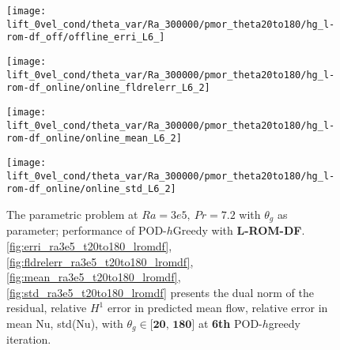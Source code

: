 \begin{figure}[h!]
    \begin{minipage}[b]{.25\linewidth}
        \centering \texttt{[image: lift\_0vel\_cond/theta\_var/Ra\_300000/pmor\_theta20to180/hg\_l-rom-df\_off/offline\_erri\_L6\_]}
        \label{fig:erri_ra3e5_t20to180_lromdf}
    \end{minipage}%
    \begin{minipage}[b]{.25\linewidth}
        \centering \texttt{[image: lift\_0vel\_cond/theta\_var/Ra\_300000/pmor\_theta20to180/hg\_l-rom-df\_online/online\_fldrelerr\_L6\_2]}
        \label{fig:fldrelerr_ra3e5_t20to180_lromdf}
    \end{minipage}
    \begin{minipage}[b]{.25\linewidth}
        \centering \texttt{[image: lift\_0vel\_cond/theta\_var/Ra\_300000/pmor\_theta20to180/hg\_l-rom-df\_online/online\_mean\_L6\_2]}
        \label{fig:mean_ra3e5_t20to180_lromdf}
    \end{minipage}%
    \begin{minipage}[b]{.25\linewidth}
        \centering \texttt{[image: lift\_0vel\_cond/theta\_var/Ra\_300000/pmor\_theta20to180/hg\_l-rom-df\_online/online\_std\_L6\_2]}
        \label{fig:std_ra3e5_t20to180_lromdf}
    \end{minipage} 
    \caption{The parametric problem at $Ra=3e5,~Pr=7.2$ with $\theta_g$ as
    parameter; performance of POD-$h$Greedy with \textbf{L-ROM-DF}.  \ref{fig:erri_ra3e5_t20to180_lromdf},
    \ref{fig:fldrelerr_ra3e5_t20to180_lromdf}, \ref{fig:mean_ra3e5_t20to180_lromdf}, \ref{fig:std_ra3e5_t20to180_lromdf}
    presents the dual norm of the residual, relative $H^1$ error in predicted
    mean flow, relative error in mean Nu, std(Nu), with $\theta_g \in
    \textbf{[20,~180]}$ at \textbf{6th} POD-$h$greedy iteration.}
    \label{fig:online_ra3e5_t20to180_lromdf} 
\end{figure}


